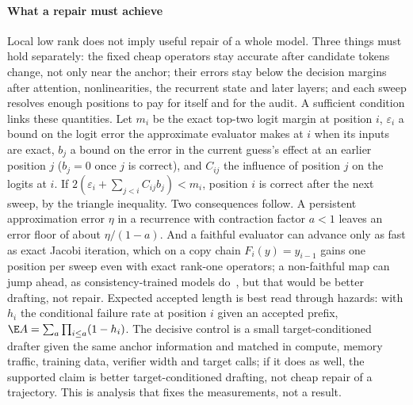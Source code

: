\paragraph{What a repair must achieve}\label{sec:repair-analysis} Local low rank does not imply useful repair of a whole model. Three things must hold separately: the fixed cheap operators stay accurate after candidate tokens change, not only near the anchor; their errors stay below the decision margins after attention, nonlinearities, the recurrent state and later layers; and each sweep resolves enough positions to pay for itself and for the audit. A sufficient condition links these quantities. Let $m_i$ be the exact top-two logit margin at position $i$, $\varepsilon_i$ a bound on the logit error the approximate evaluator makes at $i$ when its inputs are exact, $b_j$ a bound on the error in the current guess's effect at an earlier position $j$ ($b_j=0$ once $j$ is correct), and $C_{ij}$ the influence of position $j$ on the logits at $i$. If $2(\varepsilon_i+\sum_{j<i}C_{ij}b_j)<m_i$, position $i$ is correct after the next sweep, by the triangle inequality. Two consequences follow. A persistent approximation error $\eta$ in a recurrence with contraction factor $a<1$ leaves an error floor of about $\eta/(1-a)$. And a faithful evaluator can advance only as fast as exact Jacobi iteration, which on a copy chain $F_i(y)=y_{i-1}$ gains one position per sweep even with exact rank-one operators; a non-faithful map can jump ahead, as consistency-trained models do~\cite{cllm}, but that would be better drafting, not repair. Expected accepted length is best read through hazards: with $h_i$ the conditional failure rate at position $i$ given an accepted prefix, $\E A=\sum_a\prod_{i\le a}(1-h_i)$. The decisive control is a small target-conditioned drafter given the same anchor information and matched in compute, memory traffic, training data, verifier width and target calls; if it does as well, the supported claim is better target-conditioned drafting, not cheap repair of a trajectory. This is analysis that fixes the measurements, not a result.

